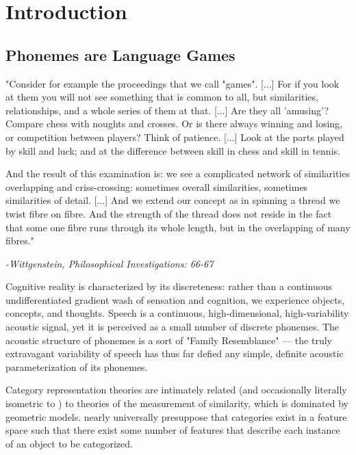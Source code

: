 
% 

\section{Introduction}
\begin{multicols}{2}
\subsection{Phonemes are Language Games}

\begin{leftbar}

"Consider for example the proceedings that we call "games". [...] For if you look at them you will not see something that is common to all, but similarities, relationships, and a whole series of them at that. [...] Are they all 'amusing'? Compare chess with noughts and crosses. Or is there always winning and losing, or competition between players? Think of patience. [...] Look at the parts played by skill and luck; and at the difference between skill in chess and skill in tennis. 

And the result of this examination is: we see a complicated network
of similarities overlapping and criss-crossing: sometimes overall similarities, sometimes similarities of detail. [...] And we extend our concept as in spinning a thread we twist fibre on fibre. And the strength of the thread does not reside in the fact that some one fibre runs through its whole length, but in the overlapping of many fibres."

\textit{-Wittgenstein, Philosophical Investigations: 66-67\cite{wittgensteinPhilosophicalInvestigations1968}}

\end{leftbar}

Cognitive reality is characterized by its discreteness: rather than a continuous undifferentiated gradient wash of sensation and cognition, we experience objects, concepts, and thoughts. Speech is a continuous, high-dimensional, high-variability acoustic signal, yet it is perceived as a small number of discrete phonemes. The acoustic structure of phonemes is a sort of "Family Resemblance"\cite{wittgensteinPhilosophicalInvestigations1968} --- the truly extravagant variability of speech has thus far defied any simple, definite acoustic parameterization of its phonemes. 

Category representation theories are intimately related (and occasionally literally isometric to \cite{Edelman1998}) to theories of the measurement of similarity, which is dominated by geometric models\cite{Tversky1977}. nearly universally presuppose that categories exist in a feature space such that there exist some number of features that describe each instance of an object to be categorized.


\end{multicols}
